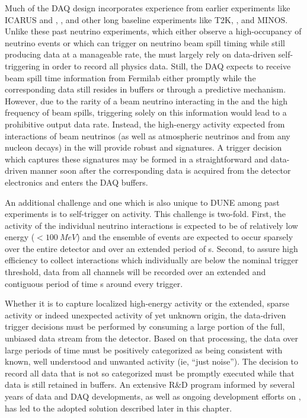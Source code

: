 Much of the DAQ design incorporates experience from earlier
 experiments like ICARUS and \microboone,
, and other long baseline experiments like T2K, \nova,
and MINOS. 
Unlike these past neutrino experiments, which either observe a
high-occupancy of neutrino events or which can trigger on neutrino beam
spill timing while still producing data at a manageable rate, the
   must largely rely on data-driven
self-triggering in order to record all physics data. 
Still, the DAQ expects to receive beam spill time information from
Fermilab either promptly while the corresponding data still resides in
buffers or through a predictive mechanism. 
However, due to the rarity of a beam neutrino interacting in the
 and the high frequency of beam spills, triggering solely on
this information would lead to a prohibitive output data rate.
Instead, the high-energy activity expected from interactions of beam neutrinos
(as well as atmospheric neutrinos and from any nucleon decays) in the
  will provide robust  and 
signatures.
A trigger decision which captures these signatures may be formed in a
straightforward and data-driven manner soon after the corresponding data
is acquired from the detector electronics and enters the DAQ buffers.

An additional
challenge and one which is also unique to DUNE among past 
experiments is to self-trigger on  activity.
This challenge is two-fold. 
First, the activity of the individual  neutrino interactions
is expected to be of relatively low energy ($<\SI{100}{MeV}$) and the
ensemble of  events are expected to occur sparsely over the
entire detector and over an extended period of \si{s}. 
Second, to assure high efficiency to collect  interactions
which individually are below the nominal trigger threshold, data from
all channels will be recorded over an extended and contiguous period of
time \si{s} around every  trigger.

Whether it is to capture localized high-energy activity or the extended,
sparse  activity or indeed unexpected activity of yet unknown
origin, the data-driven trigger decisions must be performed by consuming
a large portion of the full, unbiased data stream from the detector. 
Based on that processing, the data over large periods of time must be
positively categorized as being consistent with known, well understood
and unwanted activity (ie, ``just noise''). 
The decision to record all data that is not so categorized must be
promptly executed while that data is still retained in buffers.
An extensive R\&D program informed by several years of \microboone data
and DAQ developments, as well as ongoing development efforts on
, has led to the adopted solution described later in
this chapter. 

